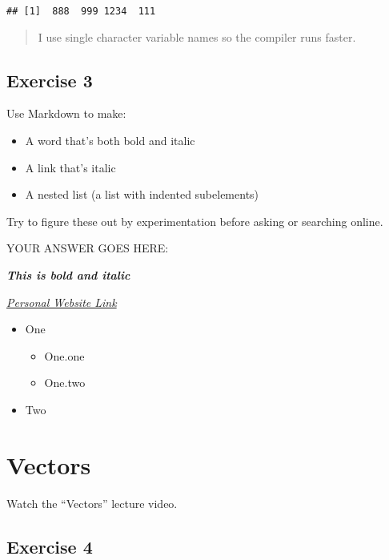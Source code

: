 \documentclass[
]{article}
\providecommand{\tightlist}{%
  \setlength{\itemsep}{0pt}\setlength{\parskip}{0pt}}
\begin{document}
\begin{verbatim}
## [1]  888  999 1234  111
\end{verbatim}

\begin{quote}
I use single character variable names so the compiler runs faster.
\end{quote}

\hypertarget{exercise-3}{%
\subsection{Exercise 3}\label{exercise-3}}

Use Markdown to make:

\begin{itemize}
\tightlist
\item
  A word that's both bold and italic
\item
  A link that's italic
\item
  A nested list (a list with indented subelements)
\end{itemize}

Try to figure these out by experimentation before asking or searching
online.

YOUR ANSWER GOES HERE:

\textbf{\emph{This is bold and italic}}

\emph{\href{http://mingyfong.github.io/}{Personal Website Link}}

\begin{itemize}
\tightlist
\item
  One

  \begin{itemize}
  \tightlist
  \item
    One.one
  \item
    One.two
  \end{itemize}
\item
  Two
\end{itemize}

\hypertarget{vectors}{%
\section{Vectors}\label{vectors}}

Watch the ``Vectors'' lecture video.

\hypertarget{exercise-4}{%
\subsection{Exercise 4}\label{exercise-4}}
\end{document}
